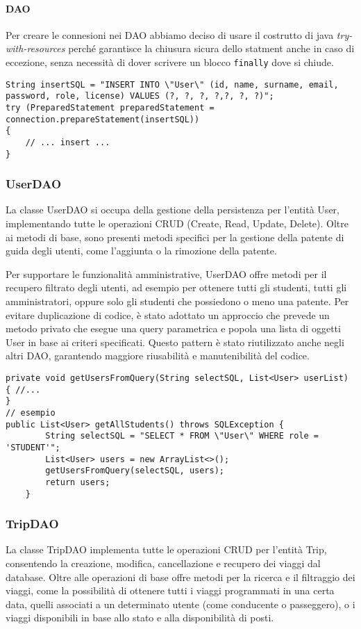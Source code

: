 \paragraph{DAO} Per creare le connesioni nei DAO abbiamo deciso di usare il costrutto di java \textit{try-with-resources} perché garantisce la chiusura sicura dello statment anche in caso di eccezione, senza necessità di dover scrivere un blocco \texttt{finally} dove si chiude.
\begin{lstlisting}[style=java, caption={Esempio di uso di try-with-resources per la connessione nel metodo insertUser di UserDAO}]
String insertSQL = "INSERT INTO \"User\" (id, name, surname, email, password, role, license) VALUES (?, ?, ?, ?,?, ?, ?)";
try (PreparedStatement preparedStatement = connection.prepareStatement(insertSQL))
{
    // ... insert ...
}
\end{lstlisting}
\subsubsection{UserDAO}
La classe UserDAO si occupa della gestione della persistenza per l'entità User, implementando tutte le operazioni CRUD (Create, Read, Update, Delete). Oltre ai metodi di base, sono presenti metodi specifici per la gestione della patente di guida degli utenti, come l'aggiunta o la rimozione della patente.

Per supportare le funzionalità amministrative, UserDAO offre metodi per il recupero filtrato degli utenti, ad esempio per ottenere tutti gli studenti, tutti gli amministratori, oppure solo gli studenti che possiedono o meno una patente. Per evitare duplicazione di codice, è stato adottato un approccio che prevede un metodo privato che esegue una query parametrica e popola una lista di oggetti User in base ai criteri specificati. Questo pattern è stato riutilizzato anche negli altri DAO, garantendo maggiore riusabilità e manutenibilità del codice.
\begin{lstlisting}[style=java, caption={Metodo per ottenere tutti gli User che soddisfano alcuni criteri}]
private void getUsersFromQuery(String selectSQL, List<User> userList) { //...
}
// esempio
public List<User> getAllStudents() throws SQLException {
        String selectSQL = "SELECT * FROM \"User\" WHERE role = 'STUDENT'";
        List<User> users = new ArrayList<>();
        getUsersFromQuery(selectSQL, users);
        return users;
    }
\end{lstlisting}
\subsubsection{TripDAO}
La classe TripDAO implementa tutte le operazioni CRUD per l'entità Trip, consentendo la creazione, modifica, cancellazione e recupero dei viaggi dal database. Oltre alle operazioni di base offre metodi per la ricerca e il filtraggio dei viaggi, come la possibilità di ottenere tutti i viaggi programmati in una certa data, quelli associati a un determinato utente (come conducente o passeggero), o i viaggi disponibili in base allo stato e alla disponibilità di posti.
